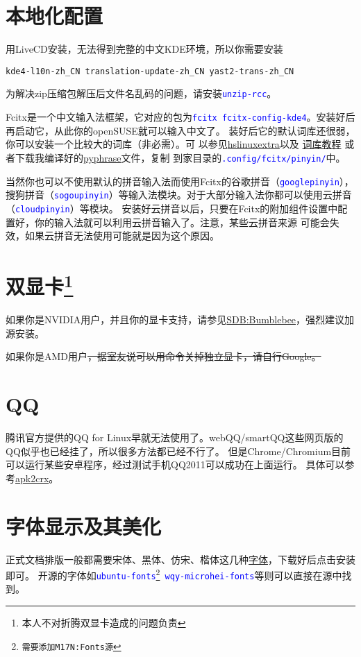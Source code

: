 \documentclass[11pt]{article}
\newcommand{\command}[1]{\texttt{\textcolor{blue}{#1}}}
\newcommand{\soft}[1]{\texttt{\textcolor{blue}{#1}}}
\begin{document}
\section{本地化配置}
用LiveCD安装，无法得到完整的中文KDE环境，所以你需要安装
\begin{Verbatim}[formatcom=\color{codecolor}]
    kde4-l10n-zh_CN translation-update-zh_CN yast2-trans-zh_CN
\end{Verbatim}

为解决zip压缩包解压后文件名乱码的问题，请安装\soft{unzip-rcc}。

Fcitx是一个中文输入法框架，它对应的包为\soft{fcitx fcitx-config-kde4}。安装好后再启动它，从此你的openSUSE就可以输入中文了。
装好后它的默认词库还很弱，你可以安装一个比较大的词库（非必需）。可%
以参见\href{https://code.google.com/p/hslinuxextra/}{hs\-linux\-extra}以及%
\href{https://www.librehat.com/fcitx-sogou-pinyin-cell-database-convert-import-guide/}{词库教程}%
或者下载我编译好的\href{http://pan.baidu.com/s/1i3HtJ4T}{pyphrase}文件，复制
到家目录的\command{.config/fcitx/pinyin/}中。

当然你也可以不使用默认的拼音输入法而使用Fcitx的谷歌拼音（\soft{goo\-gle\-pin\-yin}），
搜狗拼音（\soft{so\-gou\-pin\-yin}）等输入法模块。对于大部分输入法你都可以使用云拼音（\soft{cloud\-pin\-yin}）等模块。
安装好云拼音以后，只要在Fcitx的附加组件设置中配置好，你的输入法就可以利用云拼音输入了。注意，某些云拼音来源
可能会失效，如果云拼音无法使用可能就是因为这个原因。
\section[双显卡]{双显卡\protect\footnote{本人不对折腾双显卡造成的问题负责}}
如果你是NVIDIA用户，并且你的显卡支持，请参见\href{https://zh.opensuse.org/SDB:Bumblebee}{SDB:Bumblebee}，强烈建议加源安装。

如果你是AMD用户\sout{，据室友说可以用命令关掉独立显卡，请自行Google。}
\section{QQ}
腾讯官方提供的QQ for Linux早就无法使用了。webQQ/smartQQ这些网页版的QQ似乎也已经挂了，所以很多方法都已经不行了。
但是Chrome/Chromium目前可以运行某些安卓程序，经过测试手机QQ2011可以成功在上面运行。
具体可以参考\href{http://huodong.ustc.edu.cn/Crx}{apk2crx}。
\section{字体显示及其美化}
正式文档排版一般都需要宋体、黑体、仿宋、楷体这几种\href{http://pan.baidu.com/s/1mgiHWmO}{字体}，下载好后点击安装即可。
开源的字体如\soft{ubuntu-fonts\footnote{需要添加M17N:Fonts源} wqy-microhei-fonts}等则可以直接在源中找到。
\end{document}
